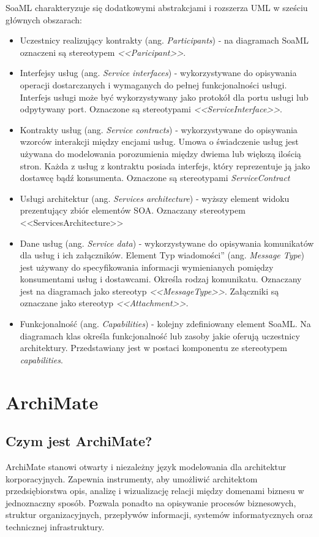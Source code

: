 SoaML charakteryzuje się dodatkowymi abstrakcjami \cite{PlatIntGor} i rozszerza UML w sześciu głównych obszarach: 
\begin{itemize}
\item{Uczestnicy realizujący kontrakty (ang. \emph{Participants}) - na diagramach SoaML oznaczeni są stereotypem \emph{<<Paricipant>>}.}
\item{Interfejsy usług (ang. \emph{Service interfaces}) - wykorzystywane do opisywania operacji dostarczanych i wymaganych do pełnej funkcjonalności usługi. Interfejs usługi może być wykorzystywany jako protokół dla portu usługi lub odpytywany port. Oznaczone są stereotypami \emph{<<ServiceInterface>>}.}
\item{Kontrakty usług (ang. \emph{Service contracts}) - wykorzystywane do opisywania wzorców interakcji między encjami usług. Umowa o świadczenie usług jest używana do modelowania porozumienia między dwiema lub większą ilością stron. Każda z usług z kontraktu posiada interfejs, który reprezentuje ją jako dostawcę bądź konsumenta. Oznaczone są stereotypami \emph{ServiceContract}}
\item{Usługi architektur (ang. \emph{Services architecture}) - wyższy element widoku prezentujący zbiór elementów SOA. Oznaczany stereotypem <<ServicesArchitecture>>}
\item{Dane usług (ang. \emph{Service data}) - wykorzystywane do opisywania komunikatów dla usług i ich załączników. Element \quotedblbase Typ wiadomości\textquotedblright} (ang. \emph{Message Type}) jest używany do specyfikowania informacji wymienianych pomiędzy konsumentami usług i dostawcami. Określa rodzaj komunikatu. Oznaczany jest na diagramach jako stereotyp \emph{<<MessageType>>}. Załączniki są oznaczane jako stereotyp \emph{<<Attachment>>.}
\item{Funkcjonalność (ang. \emph{Capabilities}) - kolejny zdefiniowany element SoaML. Na diagramach klas określa funkcjonalność lub zasoby jakie oferują uczestnicy architektury. Przedstawiany jest w postaci komponentu ze stereotypem \emph{capabilities}. \cite{SoaMLErvBase}}
\end{itemize} 


\section{ArchiMate}
\subsection{Czym jest ArchiMate?}
ArchiMate stanowi otwarty i niezależny język modelowania dla architektur korporacyjnych. Zapewnia instrumenty, aby umożliwić architektom przedsiębiorstwa opis, analizę i wizualizację relacji między domenami biznesu w jednoznaczny sposób. Pozwala ponadto na opisywanie procesów biznesowych, struktur organizacyjnych, przepływów informacji, systemów informatycznych oraz technicznej infrastruktury.

